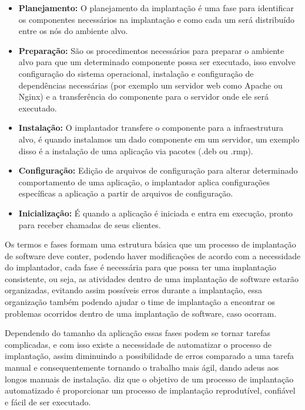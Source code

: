 \begin{itemize}
  \item  \textbf{Planejamento:} O planejamento da implantação é uma fase
  para identificar os componentes necessários na implantação e como cada um será
  distribuído entre os nós do ambiente alvo.
  \item  \textbf{Preparação:} São os procedimentos necessários para preparar o
  ambiente alvo para que um determinado componente possa ser executado, isso envolve
  configuração do sistema operacional, instalação e configuração de dependências
  necessárias (por exemplo um servidor web como Apache ou Nginx) e a transferência
  do componente para o servidor onde ele será executado.
  \item  \textbf{Instalação:} O implantador transfere o componente para a infraestrutura
  alvo, é quando instalamos um dado componente em um servidor, um exemplo disso
  é a instalação de uma aplicação via pacotes (.deb ou .rmp).
  \item  \textbf{Configuração:} Edição de arquivos de configuração para alterar
  determinado comportamento de uma aplicação, o implantador aplica configurações
  específicas a aplicação a partir de arquivos de configuração.
  \item  \textbf{Inicialização:} É quando a aplicação é iniciada e entra em execução,
  pronto para receber chamadas de seus clientes.
\end{itemize}

Os termos e fases formam uma estrutura básica que um processo de implantação de software
deve conter, podendo haver modificações de acordo com a necessidade do implantador,
cada fase é necessária para que possa ter uma implantação consistente, ou seja, as
atividades dentro de uma implantação de software estarão organizadas, evitando assim
possíveis erros durante a implantação, essa organização também podendo ajudar o
time de implantação a encontrar os problemas ocorridos dentro de uma implantação
de software, caso ocorram.

Dependendo do tamanho da aplicação essas fases podem se tornar tarefas complicadas,
e com isso existe a necessidade de automatizar o processo de implantação, assim
diminuindo a possibilidade de erros comparado a uma tarefa manual e consequentemente
tornando o trabalho mais ágil, dando adeus aos longos manuais de instalação.
\cite{humble2010} diz que o objetivo de um processo de implantação automatizado é
proporcionar um processo de implantação reprodutível, confiável e fácil de ser
executado.

